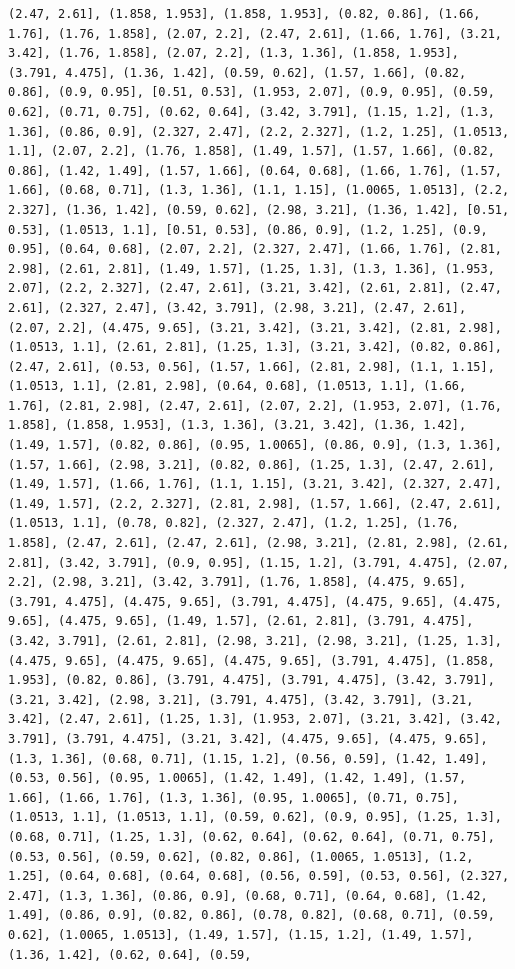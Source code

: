 \documentclass[12pt,fleqn]{article}\usepackage{../common}
\begin{document}
\begin{verbatim}
(2.47, 2.61], (1.858, 1.953], (1.858, 1.953], (0.82, 0.86], (1.66, 1.76], (1.76, 1.858], (2.07, 2.2], (2.47, 2.61], (1.66, 1.76], (3.21, 3.42], (1.76, 1.858], (2.07, 2.2], (1.3, 1.36], (1.858, 1.953], (3.791, 4.475], (1.36, 1.42], (0.59, 0.62], (1.57, 1.66], (0.82, 0.86], (0.9, 0.95], [0.51, 0.53], (1.953, 2.07], (0.9, 0.95], (0.59, 0.62], (0.71, 0.75], (0.62, 0.64], (3.42, 3.791], (1.15, 1.2], (1.3, 1.36], (0.86, 0.9], (2.327, 2.47], (2.2, 2.327], (1.2, 1.25], (1.0513, 1.1], (2.07, 2.2], (1.76, 1.858], (1.49, 1.57], (1.57, 1.66], (0.82, 0.86], (1.42, 1.49], (1.57, 1.66], (0.64, 0.68], (1.66, 1.76], (1.57, 1.66], (0.68, 0.71], (1.3, 1.36], (1.1, 1.15], (1.0065, 1.0513], (2.2, 2.327], (1.36, 1.42], (0.59, 0.62], (2.98, 3.21], (1.36, 1.42], [0.51, 0.53], (1.0513, 1.1], [0.51, 0.53], (0.86, 0.9], (1.2, 1.25], (0.9, 0.95], (0.64, 0.68], (2.07, 2.2], (2.327, 2.47], (1.66, 1.76], (2.81, 2.98], (2.61, 2.81], (1.49, 1.57], (1.25, 1.3], (1.3, 1.36], (1.953, 2.07], (2.2, 2.327], (2.47, 2.61], (3.21, 3.42], (2.61, 2.81], (2.47, 2.61], (2.327, 2.47], (3.42, 3.791], (2.98, 3.21], (2.47, 2.61], (2.07, 2.2], (4.475, 9.65], (3.21, 3.42], (3.21, 3.42], (2.81, 2.98], (1.0513, 1.1], (2.61, 2.81], (1.25, 1.3], (3.21, 3.42], (0.82, 0.86], (2.47, 2.61], (0.53, 0.56], (1.57, 1.66], (2.81, 2.98], (1.1, 1.15], (1.0513, 1.1], (2.81, 2.98], (0.64, 0.68], (1.0513, 1.1], (1.66, 1.76], (2.81, 2.98], (2.47, 2.61], (2.07, 2.2], (1.953, 2.07], (1.76, 1.858], (1.858, 1.953], (1.3, 1.36], (3.21, 3.42], (1.36, 1.42], (1.49, 1.57], (0.82, 0.86], (0.95, 1.0065], (0.86, 0.9], (1.3, 1.36], (1.57, 1.66], (2.98, 3.21], (0.82, 0.86], (1.25, 1.3], (2.47, 2.61], (1.49, 1.57], (1.66, 1.76], (1.1, 1.15], (3.21, 3.42], (2.327, 2.47], (1.49, 1.57], (2.2, 2.327], (2.81, 2.98], (1.57, 1.66], (2.47, 2.61], (1.0513, 1.1], (0.78, 0.82], (2.327, 2.47], (1.2, 1.25], (1.76, 1.858], (2.47, 2.61], (2.47, 2.61], (2.98, 3.21], (2.81, 2.98], (2.61, 2.81], (3.42, 3.791], (0.9, 0.95], (1.15, 1.2], (3.791, 4.475], (2.07, 2.2], (2.98, 3.21], (3.42, 3.791], (1.76, 1.858], (4.475, 9.65], (3.791, 4.475], (4.475, 9.65], (3.791, 4.475], (4.475, 9.65], (4.475, 9.65], (4.475, 9.65], (1.49, 1.57], (2.61, 2.81], (3.791, 4.475], (3.42, 3.791], (2.61, 2.81], (2.98, 3.21], (2.98, 3.21], (1.25, 1.3], (4.475, 9.65], (4.475, 9.65], (4.475, 9.65], (3.791, 4.475], (1.858, 1.953], (0.82, 0.86], (3.791, 4.475], (3.791, 4.475], (3.42, 3.791], (3.21, 3.42], (2.98, 3.21], (3.791, 4.475], (3.42, 3.791], (3.21, 3.42], (2.47, 2.61], (1.25, 1.3], (1.953, 2.07], (3.21, 3.42], (3.42, 3.791], (3.791, 4.475], (3.21, 3.42], (4.475, 9.65], (4.475, 9.65], (1.3, 1.36], (0.68, 0.71], (1.15, 1.2], (0.56, 0.59], (1.42, 1.49], (0.53, 0.56], (0.95, 1.0065], (1.42, 1.49], (1.42, 1.49], (1.57, 1.66], (1.66, 1.76], (1.3, 1.36], (0.95, 1.0065], (0.71, 0.75], (1.0513, 1.1], (1.0513, 1.1], (0.59, 0.62], (0.9, 0.95], (1.25, 1.3], (0.68, 0.71], (1.25, 1.3], (0.62, 0.64], (0.62, 0.64], (0.71, 0.75], (0.53, 0.56], (0.59, 0.62], (0.82, 0.86], (1.0065, 1.0513], (1.2, 1.25], (0.64, 0.68], (0.64, 0.68], (0.56, 0.59], (0.53, 0.56], (2.327, 2.47], (1.3, 1.36], (0.86, 0.9], (0.68, 0.71], (0.64, 0.68], (1.42, 1.49], (0.86, 0.9], (0.82, 0.86], (0.78, 0.82], (0.68, 0.71], (0.59, 0.62], (1.0065, 1.0513], (1.49, 1.57], (1.15, 1.2], (1.49, 1.57], (1.36, 1.42], (0.62, 0.64], (0.59, 
\end{verbatim}
\end{document}
